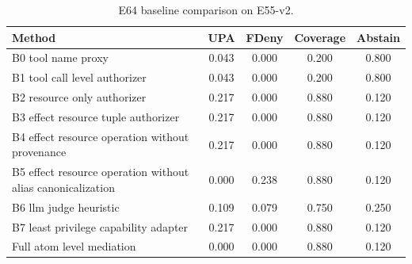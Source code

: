 \begin{table}[t]
\centering
\small
\caption{E64 baseline comparison on E55-v2.}
\label{tab:baselines-e55}
\begin{tabular}{lcccc}
\toprule
Method & UPA & FDeny & Coverage & Abstain \\
\midrule
B0 tool name proxy & 0.043 & 0.000 & 0.200 & 0.800 \\
B1 tool call level authorizer & 0.043 & 0.000 & 0.200 & 0.800 \\
B2 resource only authorizer & 0.217 & 0.000 & 0.880 & 0.120 \\
B3 effect resource tuple authorizer & 0.217 & 0.000 & 0.880 & 0.120 \\
B4 effect resource operation without provenance & 0.217 & 0.000 & 0.880 & 0.120 \\
B5 effect resource operation without alias canonicalization & 0.000 & 0.238 & 0.880 & 0.120 \\
B6 llm judge heuristic & 0.109 & 0.079 & 0.750 & 0.250 \\
B7 least privilege capability adapter & 0.217 & 0.000 & 0.880 & 0.120 \\
Full atom level mediation & 0.000 & 0.000 & 0.880 & 0.120 \\
\bottomrule
\end{tabular}
\end{table}
